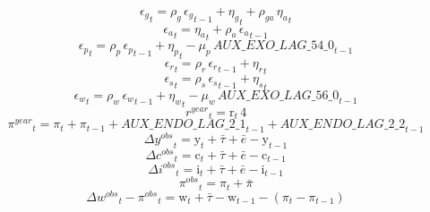 \begin{dmath}
{{\epsilon_{g}}}_{t}={{\rho_{g}}}\, {{\epsilon_{g}}}_{t-1}+{{\eta_{g}}}_{t}+{{\rho_{ga}}}\, {{\eta_{a}}}_{t}
\end{dmath}
\begin{dmath}
{{\epsilon_{a}}}_{t}={{\eta_{a}}}_{t}+{{\rho_{a}}}\, {{\epsilon_{a}}}_{t-1}
\end{dmath}
\begin{dmath}
{{\epsilon_{p}}}_{t}={{\rho_{p}}}\, {{\epsilon_{p}}}_{t-1}+{{\eta_{p}}}_{t}-{{\mu_{p}}}\, {AUX\_EXO\_LAG\_54\_0}_{t-1}
\end{dmath}
\begin{dmath}
{{\epsilon_{r}}}_{t}={{\rho_{r}}}\, {{\epsilon_{r}}}_{t-1}+{{\eta_{r}}}_{t}
\end{dmath}
\begin{dmath}
{{\epsilon_{s}}}_{t}={{\rho_{s}}}\, {{\epsilon_{s}}}_{t-1}+{{\eta_{s}}}_{t}
\end{dmath}
\begin{dmath}
{{\epsilon_{w}}}_{t}={{\rho_{w}}}\, {{\epsilon_{w}}}_{t-1}+{{\eta_{w}}}_{t}-{{\mu_{w}}}\, {AUX\_EXO\_LAG\_56\_0}_{t-1}
\end{dmath}
\begin{dmath}
{{r^{year}}}_{t}={{\mathrm{r}}}_{t}\, 4
\end{dmath}
\begin{dmath}
{{\pi^{year}}}_{t}={{\pi}}_{t}+{{\pi}}_{t-1}+{AUX\_ENDO\_LAG\_2\_1}_{t-1}+{AUX\_ENDO\_LAG\_2\_2}_{t-1}
\end{dmath}
\begin{dmath}
{{\Delta y^{obs}}}_{t}={{\mathrm{y}}}_{t}+{{\bar{\tau}}}+{{\bar{e}}}-{{\mathrm{y}}}_{t-1}
\end{dmath}
\begin{dmath}
{{\Delta c^{obs}}}_{t}={{\mathrm{c}}}_{t}+{{\bar{\tau}}}+{{\bar{e}}}-{{\mathrm{c}}}_{t-1}
\end{dmath}
\begin{dmath}
{{\Delta i^{obs}}}_{t}={{\mathrm{i}}}_{t}+{{\bar{\tau}}}+{{\bar{e}}}-{{\mathrm{i}}}_{t-1}
\end{dmath}
\begin{dmath}
{{\pi^{obs}}}_{t}={{\pi}}_{t}+{{\bar{\pi}}}
\end{dmath}
\begin{dmath}
{{\Delta w^{obs}}}_{t}-{{\pi^{obs}}}_{t}={{\mathrm{w}}}_{t}+{{\bar{\tau}}}-{{\mathrm{w}}}_{t-1}-\left({{\pi}}_{t}-{{\pi}}_{t-1}\right)
\end{dmath}
